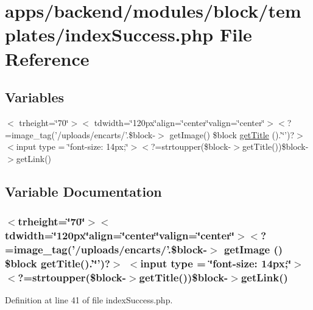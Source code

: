 \hypertarget{backend_2modules_2block_2templates_2index_success_8php}{\section{apps/backend/modules/block/templates/index\-Success.php File Reference}
\label{backend_2modules_2block_2templates_2index_success_8php}
}
\subsection*{Variables}
\begin{DoxyCompactItemize}
\item 
$<$ trheight=\char`\"{}70\char`\"{}$>$$<$ tdwidth=\char`\"{}120px\char`\"{}align=\char`\"{}center\char`\"{}valign=\char`\"{}center\char`\"{}$>$$<$?=image\-\_\-tag('/uploads/encarts/'.\$block-\/$>$ get\-Image() \$block \hyperlink{backend_2modules_2block_2templates_2index_success_8php_a58abfb4a1e6c312e255e475413e1d76d}{get\-Title} ().'\char`\"{}')?$>$ $<$input type = \char`\"{}font-\/size\-: 14px;\char`\"{}$>$$<$?=strtoupper(\$block-\/$>$get\-Title())\$block-\/$>$get\-Link()
\end{DoxyCompactItemize}


\subsection{Variable Documentation}
\hypertarget{backend_2modules_2block_2templates_2index_success_8php_a58abfb4a1e6c312e255e475413e1d76d}{
\subsubsection[{get\-Title}]{\setlength{\rightskip}{0pt plus 5cm}$<$trheight=\char`\"{}70\char`\"{}$>$$<$tdwidth=\char`\"{}120px\char`\"{}align=\char`\"{}center\char`\"{}valign=\char`\"{}center\char`\"{}$>$$<$?=image\-\_\-tag('/uploads/encarts/'.\$block-\/$>$ get\-Image () \$block get\-Title().'\char`\"{}')?$>$ $<$input type = \char`\"{}font-\/size\-: 14px;\char`\"{}$>$$<$?=strtoupper(\$block-\/$>$get\-Title())\$block-\/$>$get\-Link()}}\label{backend_2modules_2block_2templates_2index_success_8php_a58abfb4a1e6c312e255e475413e1d76d}


Definition at line 41 of file index\-Success.\-php.

